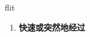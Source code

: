 
\begin{frame}
{\huge flit}
\begin{center}
\begin{enumerate}\Large
  \item \textbf{快速或突然地经过}
\end{enumerate}
\end{center}
\end{frame}
